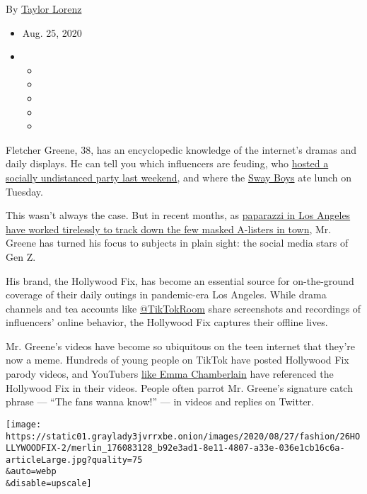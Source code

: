By \href{https://www.nytimes3xbfgragh.onion/by/taylor-lorenz}{Taylor
Lorenz}

\begin{itemize}
\item
  Aug. 25, 2020
\item
  \begin{itemize}
  \item
  \item
  \item
  \item
  \item
  \end{itemize}
\end{itemize}

Fletcher Greene, 38, has an encyclopedic knowledge of the internet's
dramas and daily displays. He can tell you which influencers are
feuding, who
\href{https://www.nytimes3xbfgragh.onion/2020/08/19/style/la-party-power-cut-tiktok.html}{hosted
a socially undistanced party last weekend}, and where the
\href{https://www.nytimes3xbfgragh.onion/2020/06/08/style/sway-house-neighbors-tiktok.html}{Sway
Boys} ate lunch on Tuesday.

This wasn't always the case. But in recent months, as
\href{https://www.nytimes3xbfgragh.onion/2020/05/20/style/paparazzi-celebrity-photos.html}{paparazzi
in Los Angeles have worked tirelessly to track down the few masked
A-listers in town}, Mr. Greene has turned his focus to subjects in plain
sight: the social media stars of Gen Z.

His brand, the Hollywood Fix, has become an essential source for
on-the-ground coverage of their daily outings in pandemic-era Los
Angeles. While drama channels and tea accounts like
\href{https://www.instagram.com/tiktokroom/?hl=en}{@TikTokRoom} share
screenshots and recordings of influencers' online behavior, the
Hollywood Fix captures their offline lives.

Mr. Greene's videos have become so ubiquitous on the teen internet that
they're now a meme. Hundreds of young people on TikTok have posted
Hollywood Fix parody videos, and YouTubers
\href{https://www.instagram.com/p/CDZYofMpnjT/}{like Emma Chamberlain}
have referenced the Hollywood Fix in their videos. People often parrot
Mr. Greene's signature catch phrase --- ``The fans wanna know!'' --- in
videos and replies on Twitter.

\texttt{[image: https://static01.graylady3jvrrxbe.onion/images/2020/08/27/fashion/26HOLLYWOODFIX-2/merlin\_176083128\_b92e3ad1-8e11-4807-a33e-036e1cb16c6a-articleLarge.jpg?quality=75\\\&auto=webp\\\&disable=upscale]}

